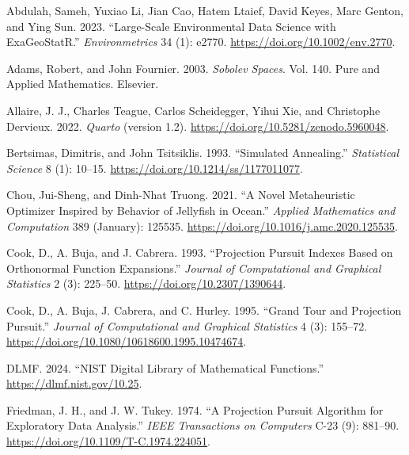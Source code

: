 \documentclass[
  12pt,
]{interact}
\newlength{\cslhangindent}
\newlength{\cslentryspacingunit} %
\newenvironment{CSLReferences}[2] %
 {%
  \setlength{\parindent}{0pt}
  \ifodd #1
  \let\oldpar\par
  \def\par{\hangindent=\cslhangindent\oldpar}
  \fi
  \setlength{\parskip}{#2\cslentryspacingunit}
 }%
 {}
\theoremstyle{plain}
\begin{document}
\hypertarget{refs}{}
\begin{CSLReferences}{1}{0}
\leavevmode{}%
Abdulah, Sameh, Yuxiao Li, Jian Cao, Hatem Ltaief, David Keyes, Marc
Genton, and Ying Sun. 2023. {``Large-Scale Environmental Data Science
with {ExaGeoStatR}.''} \emph{Environmetrics} 34 (1): e2770.
\url{https://doi.org/10.1002/env.2770}.

\leavevmode{}%
Adams, Robert, and John Fournier. 2003. \emph{Sobolev Spaces}. Vol. 140.
Pure and Applied Mathematics. Elsevier.

\leavevmode{}%
Allaire, J. J., Charles Teague, Carlos Scheidegger, Yihui Xie, and
Christophe Dervieux. 2022. \emph{{Quarto}} (version 1.2).
\url{https://doi.org/10.5281/zenodo.5960048}.

\leavevmode{}%
Bertsimas, Dimitris, and John Tsitsiklis. 1993. {``{Simulated
Annealing}.''} \emph{Statistical Science} 8 (1): 10--15.
\url{https://doi.org/10.1214/ss/1177011077}.

\leavevmode{}%
Chou, Jui-Sheng, and Dinh-Nhat Truong. 2021. {``A Novel Metaheuristic
Optimizer Inspired by Behavior of Jellyfish in Ocean.''} \emph{Applied
Mathematics and Computation} 389 (January): 125535.
\url{https://doi.org/10.1016/j.amc.2020.125535}.

\leavevmode{}%
Cook, D., A. Buja, and J. Cabrera. 1993. {``Projection Pursuit Indexes
Based on Orthonormal Function Expansions.''} \emph{Journal of
Computational and Graphical Statistics} 2 (3): 225--50.
\url{https://doi.org/10.2307/1390644}.

\leavevmode{}%
Cook, D., A. Buja, J. Cabrera, and C. Hurley. 1995. {``Grand Tour and
Projection Pursuit.''} \emph{Journal of Computational and Graphical
Statistics} 4 (3): 155--72.
\url{https://doi.org/10.1080/10618600.1995.10474674}.

\leavevmode{}%
DLMF. 2024. {``{NIST Digital Library of Mathematical Functions}.''}
\url{https://dlmf.nist.gov/10.25}.

\leavevmode{}%
Friedman, J. H., and J. W. Tukey. 1974. {``A Projection Pursuit
Algorithm for Exploratory Data Analysis.''} \emph{IEEE Transactions on
Computers} C-23 (9): 881--90.
\url{https://doi.org/10.1109/T-C.1974.224051}.


\end{CSLReferences}
\end{document}
